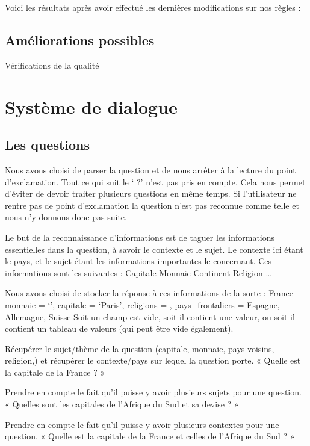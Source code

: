 \documentclass[11pt,a4paper]{article}
\begin{document}
Voici les résultats après avoir effectué les dernières modifications sur nos règles :

\subsection{Améliorations possibles}
Vérifications de la qualité

\section{Système de dialogue}

\subsection{Les questions}

Nous avons choisi de parser la question et de nous arrêter à la lecture du point d’exclamation. Tout ce qui suit le ‘ ?’ n’est pas pris en compte. Cela nous permet d’éviter de devoir traiter plusieurs questions en même temps. Si l’utilisateur ne rentre pas de point d’exclamation la question n’est pas reconnue comme telle et nous n’y donnons donc pas suite.
 
Le but de la reconnaissance d’informations est de taguer les informations essentielles dans la question, à savoir le contexte et le sujet. Le contexte ici étant le pays, et le sujet étant les informations importantes le concernant. Ces informations sont les suivantes :
Capitale
Monnaie
Continent
Religion
…


Nous avons choisi de stocker la réponse à ces informations de la sorte :
France {
            	monnaie = ‘’,
            	capitale = ‘Paris’,
            	religions = {},
            	pays\_frontaliers = { Espagne, Allemagne, Suisse }
}
Soit un champ est vide, soit il contient une valeur, ou soit il contient un tableau de valeurs (qui peut être vide également).
 
 
Récupérer le sujet/thème de la question (capitale, monnaie, pays voisins, religion,) et récupérer le contexte/pays sur lequel la question porte.
« Quelle est la capitale de la France ? » 
 
Prendre en compte le fait qu’il puisse y avoir plusieurs sujets pour une question.
« Quelles sont les capitales de l’Afrique du Sud et sa devise ? »
 
Prendre en compte le fait qu’il puisse y avoir plusieurs contextes pour une question.
« Quelle est la capitale de la France et celles de l’Afrique du Sud ? »
 
\end{document}
